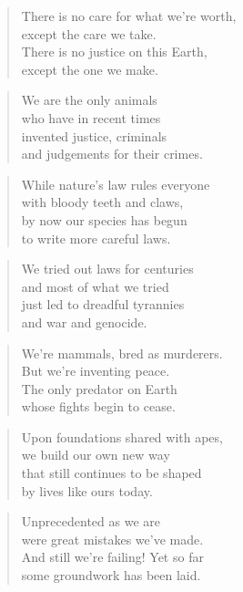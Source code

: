 \documentclass[10pt,a4paper]{article}
\begin{document}
\begin{paracol}{2}
\begin{verse}
There is no care for what we’re worth,\\
except the care we take.\\
There is no justice on this Earth,\\
except the one we make.
\end{verse}

\begin{verse}
We are the only animals\\
who have in recent times\\
invented justice, criminals\\
and judgements for their crimes.
\end{verse}

\begin{verse}
While nature’s law rules everyone\\
with bloody teeth and claws,\\
by now our species has begun\\
to write more careful laws.
\end{verse}

\begin{verse}
We tried out laws for centuries\\
and most of what we tried\\
just led to dreadful tyrannies\\
and war and genocide.
\end{verse}

\begin{verse}
We’re mammals, bred as murderers.\\
But we’re inventing peace.\\
The only predator on Earth\\
whose fights begin to cease.
\end{verse}

\begin{verse}
Upon foundations shared with apes,\\
we build our own new way\\
that still continues to be shaped\\
by lives like ours today.
\end{verse}

\begin{verse}
Unprecedented as we are\\
were great mistakes we’ve made.\\
And still we’re failing! Yet so far\\
some groundwork has been laid.
\end{verse}


\end{paracol}
\end{document}
